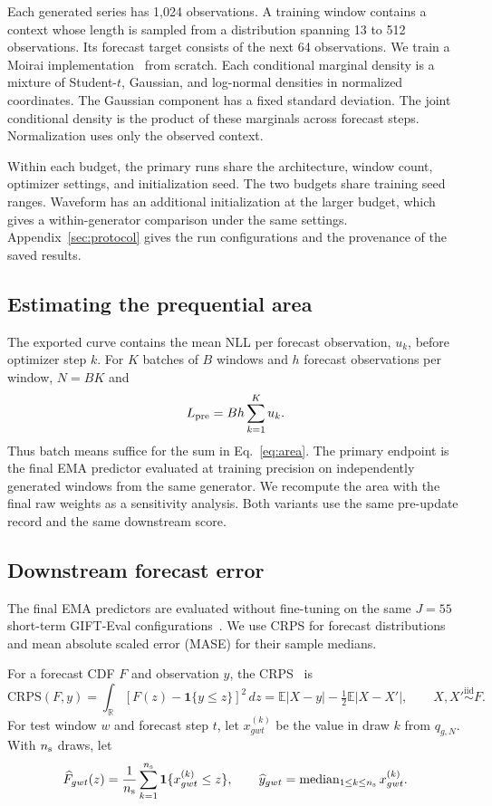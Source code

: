 \documentclass[10pt,a4paper]{article}
\theoremstyle{definition}
\begin{document}
Each generated series has 1,024 observations. A training window contains
a context whose length is sampled from a distribution spanning 13 to 512
observations. Its forecast target consists of the next 64 observations.
We train a Moirai implementation~\cite{woo2024} from scratch. Each
conditional marginal density is a mixture of Student-$t$, Gaussian, and
log-normal densities in normalized coordinates. The Gaussian component
has a fixed standard deviation. The joint conditional density is the
product of these marginals across forecast steps. Normalization uses only
the observed context.

Within each budget, the primary runs share the architecture, window
count, optimizer settings, and initialization seed. The two budgets
share training seed ranges. Waveform has an additional initialization at
the larger budget, which gives a within-generator comparison under the
same settings. Appendix~\ref{sec:protocol} gives the run configurations
and the provenance of the saved results.

\subsection{Estimating the prequential area}
The exported curve contains the mean NLL per forecast observation, $u_k$,
before optimizer step $k$. For $K$ batches of $B$ windows and $h$
forecast observations per window, $N=BK$ and
\[
 L_{\rm pre}=Bh\sum_{k=1}^{K}u_k.
\]
Thus batch means suffice for the sum in Eq.~\eqref{eq:area}. The primary
endpoint is the final EMA predictor evaluated at training precision on
independently generated windows from the same generator. We recompute the
area with the final raw weights as a sensitivity analysis. Both variants
use the same pre-update record and the same downstream score.

\subsection{Downstream forecast error}\label{sec:downstream-evaluation}
The final EMA predictors are evaluated without fine-tuning on the same
$J=55$ short-term GIFT-Eval configurations~\cite{aksu2024}. We use CRPS
for forecast distributions and mean absolute scaled error (MASE) for
their sample medians.

For a forecast CDF $F$ and observation $y$,
the CRPS~\cite{gneiting2007} is
\[
 \mathrm{CRPS}(F,y)=\int_{\mathbb R}[F(z)-\mathbf{1}\{y\le z\}]^2\,dz
 =\mathbb E|X-y|-\tfrac12\mathbb E|X-X'|,
 \qquad X,X'\overset{\mathrm{iid}}{\sim}F.
\]
For test window $w$ and forecast step $t$, let $x^{(k)}_{gwt}$ be the
value in draw $k$ from $q_{g,N}$. With $n_{\rm s}$ draws, let
\[
 \widehat F_{gwt}(z)=\frac{1}{n_{\rm s}}\sum_{k=1}^{n_{\rm s}}
 \mathbf{1}\{x^{(k)}_{gwt}\le z\},\qquad
 \widehat y_{gwt}=\operatorname{median}_{1\le k\le n_{\rm s}} x^{(k)}_{gwt}.
\]
\end{document}
